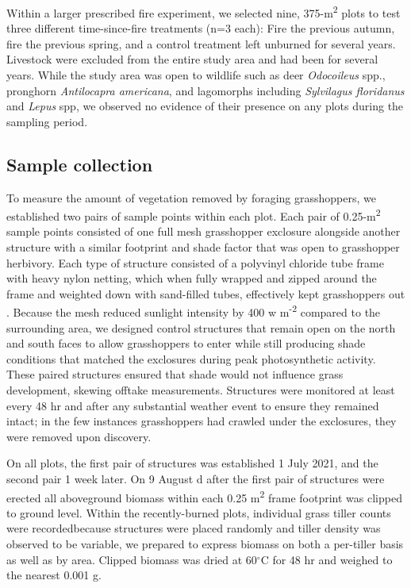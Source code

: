 \documentclass[referee, 
	            sn-basic]
           {sn-jnl}
\begin{document}
\begin{linenumbers}
Within a larger prescribed fire experiment, we selected nine, 375-m\textsuperscript{2} plots to test three different time-since-fire treatments (n=3 each): Fire the previous autumn, fire the previous spring, and a control treatment left unburned for several years. 
Livestock were excluded from the entire study area and had been for several years.
While the study area was open to wildlife such as deer \emph{Odocoileus} spp., pronghorn \emph{Antilocapra americana}, and lagomorphs including \emph{Sylvilagus floridanus} and \emph{Lepus} spp, we observed no evidence of their presence on any plots during the sampling period. 

\subsection{Sample collection}

To measure the amount of vegetation removed by foraging grasshoppers, we established two pairs of sample points within each plot. 
Each pair of 0.25-m\textsuperscript{2} sample points consisted of one full mesh grasshopper exclosure alongside another structure with a similar footprint and shade factor that was open to grasshopper herbivory.
Each type of structure consisted of a polyvinyl chloride tube frame with heavy nylon netting, which when fully wrapped and zipped around the frame and weighted down with sand-filled tubes, effectively kept grasshoppers out \citep{parker1985}. 
Because the mesh reduced sunlight intensity by 400 w m\textsuperscript{-2} compared to the
surrounding area, we designed control structures that remain open on the north and south faces to allow grasshoppers to enter while still producing shade conditions that matched the exclosures during peak photosynthetic activity. 
These paired structures ensured that shade would not influence grass development, skewing offtake measurements. 
Structures were monitored at least every 48 hr and after any substantial weather event to ensure they remained intact; in the few instances grasshoppers had crawled under the exclosures, they were removed upon discovery. 

On all plots, the first pair of structures was established 1 July 2021, and the second pair 1 week later. 
On 9 August d after the first pair of structures were erected\textemdash 
all aboveground biomass within each 0.25 m\textsuperscript{2} frame footprint was clipped to ground level.
Within the recently-burned plots, individual grass tiller counts were recorded\textemdash because structures were placed randomly and tiller density was observed to be variable, we prepared to express biomass on both a per-tiller basis as well as by area. 
Clipped biomass was dried at 60$^\circ$C for 48 hr and weighed to the nearest 0.001 g. 


\end{linenumbers}
\end{document}
